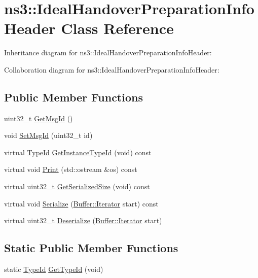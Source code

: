 \hypertarget{classns3_1_1IdealHandoverPreparationInfoHeader}{}\section{ns3\+:\+:Ideal\+Handover\+Preparation\+Info\+Header Class Reference}
\label{classns3_1_1IdealHandoverPreparationInfoHeader}


Inheritance diagram for ns3\+:\+:Ideal\+Handover\+Preparation\+Info\+Header\+:


Collaboration diagram for ns3\+:\+:Ideal\+Handover\+Preparation\+Info\+Header\+:
\subsection*{Public Member Functions}
\begin{DoxyCompactItemize}
\item 
uint32\+\_\+t \hyperlink{classns3_1_1IdealHandoverPreparationInfoHeader_a209dad8d518c573781cf91a07341723e}{Get\+Msg\+Id} ()
\item 
void \hyperlink{classns3_1_1IdealHandoverPreparationInfoHeader_a647bcac99c75577e32f0e28ff5823745}{Set\+Msg\+Id} (uint32\+\_\+t id)
\item 
virtual \hyperlink{classns3_1_1TypeId}{Type\+Id} \hyperlink{classns3_1_1IdealHandoverPreparationInfoHeader_afac08e0f52931243abeb6893973fbfc8}{Get\+Instance\+Type\+Id} (void) const 
\item 
virtual void \hyperlink{classns3_1_1IdealHandoverPreparationInfoHeader_a2752570d0e88228c3563ceb8cb795222}{Print} (std\+::ostream \&os) const 
\item 
virtual uint32\+\_\+t \hyperlink{classns3_1_1IdealHandoverPreparationInfoHeader_ab8891c463827b9703deeff8b1df6fdd5}{Get\+Serialized\+Size} (void) const 
\item 
virtual void \hyperlink{classns3_1_1IdealHandoverPreparationInfoHeader_ab6c3fb008541522b45fae7de1bce70dc}{Serialize} (\hyperlink{classns3_1_1Buffer_1_1Iterator}{Buffer\+::\+Iterator} start) const 
\item 
virtual uint32\+\_\+t \hyperlink{classns3_1_1IdealHandoverPreparationInfoHeader_a00fb4876f3c51d13765fbd8c17f584d1}{Deserialize} (\hyperlink{classns3_1_1Buffer_1_1Iterator}{Buffer\+::\+Iterator} start)
\end{DoxyCompactItemize}
\subsection*{Static Public Member Functions}
\begin{DoxyCompactItemize}
\item 
static \hyperlink{classns3_1_1TypeId}{Type\+Id} \hyperlink{classns3_1_1IdealHandoverPreparationInfoHeader_aa89651d7e450aadb8ce0f3f5d92698cf}{Get\+Type\+Id} (void)
\end{DoxyCompactItemize}

